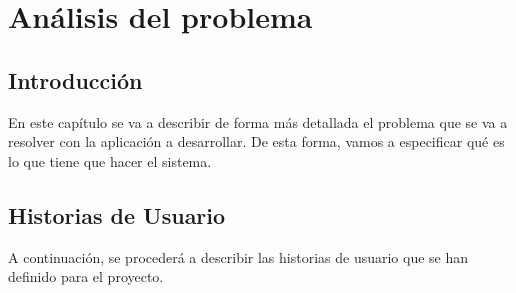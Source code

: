\chapter{Análisis del problema}

\section{Introducción}
En este capítulo se va a describir de forma más detallada el problema que se va a resolver con la aplicación a desarrollar. De esta forma, vamos a especificar qué es lo que 
tiene que hacer el sistema.  
\section{Historias de Usuario}
A continuación, se procederá a describir las historias de usuario que se han definido para el proyecto. 

